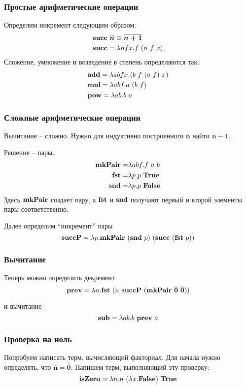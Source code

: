 \documentclass{beamer}
\newcommand{\mmterm}[1]{\text{\textbf{#1}}}
\newcommand{\mmt}{\mmterm{True}}
\newcommand{\mmf}{\mmterm{False}}
\newcommand{\mmchurchn}[1]{\boldsymbol{\overline{#1}}}
\begin{document}
\begin{frame}\frametitle{Простые арифметические операции}
    
Определим инкремент следующим образом:
\begin{align*}
	& \mmterm{succ}\ \mmchurchn{n} \equiv \mmchurchn{n+1}\\
	& \mmterm{succ} = \lambda nfx. f\ (n\ f\ x)
\end{align*}
Сложение, умножение и возведение в степень определяются так:
\begin{align*}
	&\mmterm{add} = \lambda abfx.(b\ f\ (a\ f)\ x)\\
	&\mmterm{mul} = \lambda abf.a\ (b\ f)\\
	&\mmterm{pow} = \lambda ab.b\ a
\end{align*}

\end{frame}

\begin{frame}\frametitle{Сложные арифметические операции}
    
Вычитание -- сложно.
Нужно для индуктивно построенного $\mmchurchn{n}$ найти $\mmchurchn{n-1}$.

Решение -- пары.
\begin{align*}
	\mmterm{mkPair} = &\lambda abf.f\ a\ b\\
	\mmterm{fst} = &\lambda p.p\ \mmterm{True}\\
	\mmterm{snd} = &\lambda p.p\ \mmterm{False}
\end{align*}
Здесь $\mmterm{mkPair}$ создает пару, а $\mmterm{fst}$ и $\mmterm{snd}$ получают первый и второй элементы пары соответственно.

Далее определим ``инкремент'' пары
\[\mmterm{succP} = \lambda p. \mmterm{mkPair}\ (\mmterm{snd}\ p)\ (\mmterm{succ}\ (\mmterm{fst}\ p))\]

\end{frame}

\begin{frame}\frametitle{Вычитание}
    
Теперь можно определить декремент
\[\mmterm{prev} = \lambda n.\mmterm{fst}\ (n\ \mmterm{succP}\ (\mmterm{mkPair}\ \mmchurchn{0}\ \mmchurchn{0}))\]

и вычитание
\[\mmterm{sub} = \lambda ab.b\ \mmterm{prev}\ a\]

\end{frame}

\begin{frame}\frametitle{Проверка на ноль}
    
Попробуем написать терм, вычисляющий факториал.
Для начала нужно определять, что $\mmchurchn{n} = \mmchurchn{0}$.
Напишем терм, выполняющий эту проверку:
\[\mmterm{isZero} = \lambda n.n\ (\lambda x. \mmf)\ \mmt\]

\end{frame}
\end{document}
